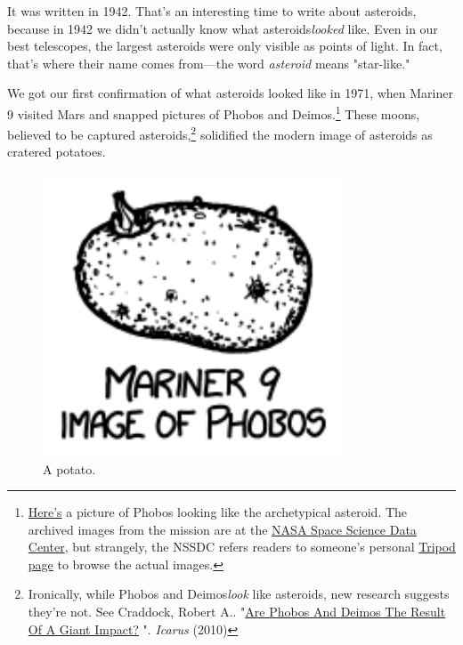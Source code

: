 {{It was written in 1942. That's an interesting time to write about asteroids, because in 1942 we didn't actually know what asteroids\emph{looked} like. Even in our best telescopes, the largest asteroids were only visible as points of light. In fact, that's where their name comes from—the word \emph{asteroid} means "star-like."}

{We got our first confirmation of what asteroids looked like in 1971, when Mariner 9 visited Mars and snapped pictures of Phobos and Deimos.{\footnote{ \href{http://nssdc.gsfc.nasa.gov/imgcat/html/object\_page/m09\_mtvs4109\_09.html}{Here's} a picture of Phobos looking like the archetypical asteroid. The archived images from the mission are at the \href{http://nssdc.gsfc.nasa.gov/nmc/masterCatalog.do?ds=PSPG-00235}{NASA Space Science Data Center}, but strangely, the NSSDC refers readers to someone's personal \href{http://petermasek.tripod.com/mariner9.html}{Tripod page} to browse the actual images.} } These moons, believed to be captured asteroids,{\footnote{Ironically, while Phobos and Deimos\emph{look} like asteroids, new research suggests they're not. See Craddock, Robert A.. "\href{http://www.sciencedirect.com/science/article/pii/S0019103510004100}{Are Phobos And Deimos The Result Of A Giant Impact?} ". \emph{Icarus} (2010)} } solidified the modern image of asteroids as cratered potatoes.}

\begin{figure}[!htbp]
\centering
\includegraphics[scale=0.5, max width=0.8\textwidth]{imgs/a/68/asteroid_potato.png}
\caption{A potato.}
\end{figure}

}

